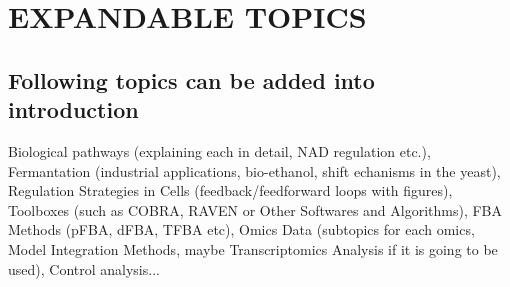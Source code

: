\chapter{EXPANDABLE TOPICS}

\section{Following topics can be added into introduction}
Biological pathways (explaining each in detail, NAD regulation etc.), Fermantation (industrial applications, bio-ethanol, shift echanisms in the yeast), Regulation Strategies in Cells (feedback/feedforward loops with figures), Toolboxes (such as COBRA, RAVEN or Other Softwares and Algorithms), FBA Methods (pFBA, dFBA, TFBA etc), Omics Data (subtopics for each omics, Model Integration Methods, maybe Transcriptomics Analysis if it is going to be used), Control analysis...
